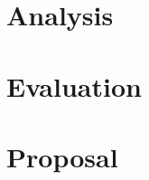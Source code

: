\documentclass[a4paper]{report}
\begin{document}
\chapter{Analysis}
\label{analysis}

\chapter{Evaluation}

\appendix
\chapter{Proposal}





\end{document}
